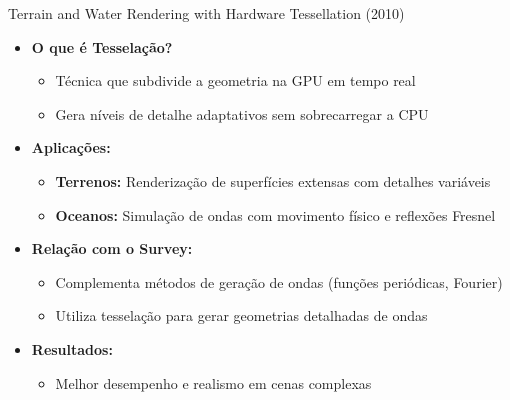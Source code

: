 \documentclass[aspectratio=169,xcolor=table]{beamer}
\begin{document}
\begin{frame}{Terrain and Water Rendering with Hardware Tessellation (2010)}
    \begin{itemize}
      \item \textbf{O que é Tesselação?}
        \begin{itemize}
          \item Técnica que subdivide a geometria na GPU em tempo real
          \item Gera níveis de detalhe adaptativos sem sobrecarregar a CPU
        \end{itemize}
      \item \textbf{Aplicações:}
        \begin{itemize}
          \item \textbf{Terrenos:} Renderização de superfícies extensas com detalhes variáveis
          \item \textbf{Oceanos:} Simulação de ondas com movimento físico e reflexões Fresnel
        \end{itemize}
      \item \textbf{Relação com o Survey:}
        \begin{itemize}
          \item Complementa métodos de geração de ondas (funções periódicas, Fourier)
          \item Utiliza tesselação para gerar geometrias detalhadas de ondas
        \end{itemize}
      \item \textbf{Resultados:}
        \begin{itemize}
          \item Melhor desempenho e realismo em cenas complexas
        \end{itemize}
    \end{itemize}
  \end{frame}
\end{document}
